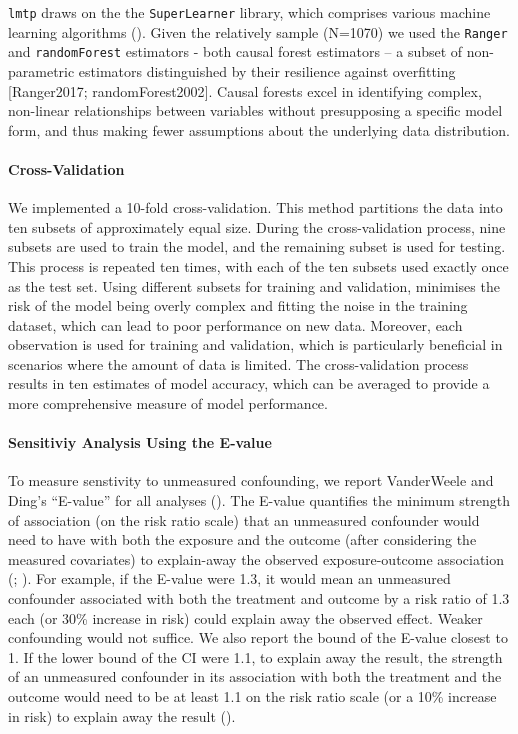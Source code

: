 \documentclass[
  singlecolumn]{article}
\let\oldparagraph\paragraph
\renewcommand{\paragraph}[1]{\oldparagraph{#1}\mbox{}}
\begin{document}
\texttt{lmtp} draws on the the \texttt{SuperLearner} library, which
comprises various machine learning algorithms
(). Given the
relatively sample (N=1070) we used the \texttt{Ranger} and
\texttt{randomForest} estimators - both causal forest estimators -- a
subset of non-parametric estimators distinguished by their resilience
against overfitting {[}Ranger2017; randomForest2002{]}. Causal forests
excel in identifying complex, non-linear relationships between variables
without presupposing a specific model form, and thus making fewer
assumptions about the underlying data distribution.

\paragraph{Cross-Validation}\label{cross-validation}

We implemented a 10-fold cross-validation. This method partitions the
data into ten subsets of approximately equal size. During the
cross-validation process, nine subsets are used to train the model, and
the remaining subset is used for testing. This process is repeated ten
times, with each of the ten subsets used exactly once as the test set.
Using different subsets for training and validation, minimises the risk
of the model being overly complex and fitting the noise in the training
dataset, which can lead to poor performance on new data. Moreover, each
observation is used for training and validation, which is particularly
beneficial in scenarios where the amount of data is limited. The
cross-validation process results in ten estimates of model accuracy,
which can be averaged to provide a more comprehensive measure of model
performance.

\paragraph{Sensitiviy Analysis Using the
E-value}\label{sensitiviy-analysis-using-the-e-value}

To measure senstivity to unmeasured confounding, we report VanderWeele
and Ding's ``E-value'' for all analyses
(). The E-value
quantifies the minimum strength of association (on the risk ratio scale)
that an unmeasured confounder would need to have with both the exposure
and the outcome (after considering the measured covariates) to
explain-away the observed exposure-outcome association
(;
). For
example, if the E-value were 1.3, it would mean an unmeasured confounder
associated with both the treatment and outcome by a risk ratio of 1.3
each (or 30\% increase in risk) could explain away the observed effect.
Weaker confounding would not suffice. We also report the bound of the
E-value closest to 1. If the lower bound of the CI were 1.1, to explain
away the result, the strength of an unmeasured confounder in its
association with both the treatment and the outcome would need to be at
least 1.1 on the risk ratio scale (or a 10\% increase in risk) to
explain away the result ().
\end{document}
